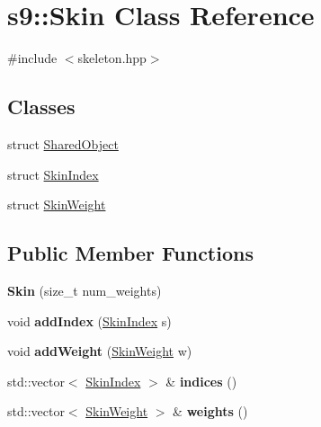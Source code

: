 \hypertarget{classs9_1_1Skin}{\section{s9\-:\-:Skin Class Reference}
\label{classs9_1_1Skin}
}


{\ttfamily \#include $<$skeleton.\-hpp$>$}

\subsection*{Classes}
\begin{DoxyCompactItemize}
\item 
struct \hyperlink{structs9_1_1Skin_1_1SharedObject}{Shared\-Object}
\item 
struct \hyperlink{structs9_1_1Skin_1_1SkinIndex}{Skin\-Index}
\item 
struct \hyperlink{structs9_1_1Skin_1_1SkinWeight}{Skin\-Weight}
\end{DoxyCompactItemize}
\subsection*{Public Member Functions}
\begin{DoxyCompactItemize}
\item 
\hypertarget{classs9_1_1Skin_a4b451b5f0a0d54fcfddc70d683867ff1}{{\bfseries Skin} (size\-\_\-t num\-\_\-weights)}\label{classs9_1_1Skin_a4b451b5f0a0d54fcfddc70d683867ff1}

\item 
\hypertarget{classs9_1_1Skin_a4a864dec5884e946d41996e3bb5045b2}{void {\bfseries add\-Index} (\hyperlink{structs9_1_1Skin_1_1SkinIndex}{Skin\-Index} s)}\label{classs9_1_1Skin_a4a864dec5884e946d41996e3bb5045b2}

\item 
\hypertarget{classs9_1_1Skin_a23a77091c1c9d06a494278aefa1108ef}{void {\bfseries add\-Weight} (\hyperlink{structs9_1_1Skin_1_1SkinWeight}{Skin\-Weight} w)}\label{classs9_1_1Skin_a23a77091c1c9d06a494278aefa1108ef}

\item 
\hypertarget{classs9_1_1Skin_aa8698ea541a9018417f272dfe37b41bf}{std\-::vector$<$ \hyperlink{structs9_1_1Skin_1_1SkinIndex}{Skin\-Index} $>$ \& {\bfseries indices} ()}\label{classs9_1_1Skin_aa8698ea541a9018417f272dfe37b41bf}

\item 
\hypertarget{classs9_1_1Skin_a16087c6f41ffd10897e4b616d5522d29}{std\-::vector$<$ \hyperlink{structs9_1_1Skin_1_1SkinWeight}{Skin\-Weight} $>$ \& {\bfseries weights} ()}\label{classs9_1_1Skin_a16087c6f41ffd10897e4b616d5522d29}

\end{DoxyCompactItemize}
